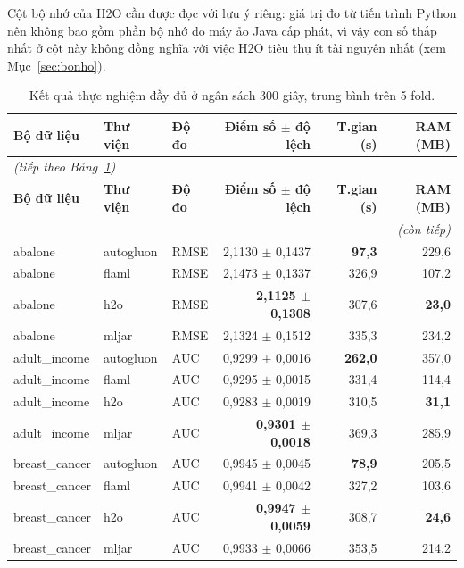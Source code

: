 Cột bộ nhớ của H2O cần được đọc với lưu ý riêng: giá trị đo từ tiến trình Python
nên không bao gồm phần bộ nhớ do máy ảo Java cấp phát, vì vậy con số thấp nhất ở
cột này không đồng nghĩa với việc H2O tiêu thụ ít tài nguyên nhất
(xem Mục~\ref{sec:bonho}).

\begingroup
\small
\setlength{\tabcolsep}{4pt}
\begin{longtable}{@{}l l l r r r@{}}
\caption{Kết quả thực nghiệm đầy đủ ở ngân sách 300 giây, trung bình trên 5 fold.}
\label{tab:ketqua} \\
\toprule
\textbf{Bộ dữ liệu} & \textbf{Thư viện} & \textbf{Độ đo} & \textbf{Điểm số $\pm$ độ lệch} & \textbf{T.gian (s)} & \textbf{RAM (MB)} \\
\midrule
\endfirsthead
\multicolumn{6}{l}{\small\textit{(tiếp theo Bảng~\ref{tab:ketqua})}} \\
\toprule
\textbf{Bộ dữ liệu} & \textbf{Thư viện} & \textbf{Độ đo} & \textbf{Điểm số $\pm$ độ lệch} & \textbf{T.gian (s)} & \textbf{RAM (MB)} \\
\midrule
\endhead
\midrule
\multicolumn{6}{r}{\small\textit{(còn tiếp)}} \\
\endfoot
\bottomrule
\endlastfoot
abalone & autogluon & RMSE & 2,1130 $\pm$ 0,1437 & \textbf{97,3} & 229,6 \\
abalone & flaml     & RMSE & 2,1473 $\pm$ 0,1337 & 326,9 & 107,2 \\
abalone & h2o       & RMSE & \textbf{2,1125 $\pm$ 0,1308} & 307,6 & \textbf{23,0} \\
abalone & mljar     & RMSE & 2,1324 $\pm$ 0,1512 & 335,3 & 234,2 \\
\midrule
adult\_income & autogluon & AUC & 0,9299 $\pm$ 0,0016 & \textbf{262,0} & 357,0 \\
adult\_income & flaml     & AUC & 0,9295 $\pm$ 0,0015 & 331,4 & 114,4 \\
adult\_income & h2o       & AUC & 0,9283 $\pm$ 0,0019 & 310,5 & \textbf{31,1} \\
adult\_income & mljar     & AUC & \textbf{0,9301 $\pm$ 0,0018} & 369,3 & 285,9 \\
\midrule
breast\_cancer & autogluon & AUC & 0,9945 $\pm$ 0,0045 & \textbf{78,9} & 205,5 \\
breast\_cancer & flaml     & AUC & 0,9941 $\pm$ 0,0042 & 327,2 & 103,6 \\
breast\_cancer & h2o       & AUC & \textbf{0,9947 $\pm$ 0,0059} & 308,7 & \textbf{24,6} \\
breast\_cancer & mljar     & AUC & 0,9933 $\pm$ 0,0066 & 353,5 & 214,2 \\

\end{longtable}
